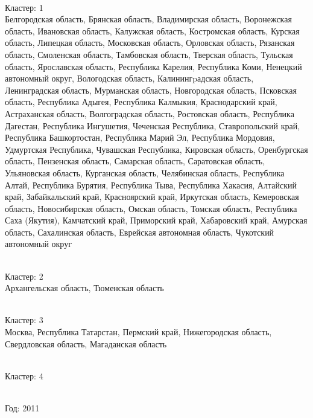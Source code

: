 \documentclass[11pt]{article}
\begin{document}
\newline \\ Кластер:  1
\\ Белгородская область, Брянская область, Владимирская область, Воронежская область, Ивановская область, Калужская область, Костромская область, Курская область, Липецкая область, Московская область, Орловская область, Рязанская область, Смоленская область, Тамбовская область, Тверская область, Тульская область, Ярославская область, Республика Карелия, Республика Коми, Ненецкий автономный округ, Вологодская область, Калинингpадская область, Ленинградская область, Мурманская область, Новгородская область, Псковская область, Республика Адыгея, Республика Калмыкия, Краснодарский край, Астраханская область, Волгоградская область, Ростовская область, Республика Дагестан, Республика Ингушетия, Чеченская Республика, Ставропольский край, Республика Башкортостан, Республика Марий Эл, Республика Мордовия, Удмуртская Республика, Чувашская Республика, Кировская область, Оренбургская область, Пензенская область, Самарская область, Саратовская область, Ульяновская область, Курганская область, Челябинская область, Республика Алтай, Республика Бурятия, Республика Тыва, Республика Хакасия, Алтайский край, Забайкальский край, Красноярский край, Иркутская область, Кемеровская область, Новосибирская область, Омская область, Томская область, Республика Саха (Якутия), Камчатский край, Приморский край, Хабаровский край, Амурская область, Сахалинская область, Еврейская автономная область, Чукотский автономный округ

\newline \\ Кластер:  2
\\ Архангельская область, Тюменская область

\newline \\ Кластер:  3
\\ Москва, Республика Татарстан, Пермский край, Нижегородская область, Свердловская область, Магаданская область

\newline \\ Кластер:  4



\newline \newline \\ Год:  2011
\end{document}

